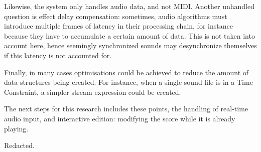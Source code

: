 \documentclass{article}
\begin{document}
Likewise, the system only handles audio data, and not MIDI.
Another unhandled question is effect delay compensation: sometimes, audio algorithms must introduce multiple frames of latency in their processing chain, for instance because they have to accumulate a certain amount of data.
This is not taken into account here, hence seemingly synchronized sounds may desynchronize themselves if this latency is not accounted for.

Finally, in many cases optimisations could be achieved to reduce the amount of data structures being created. For instance, when a single sound file is in a Time Constraint, a simpler stream expression could be created.

The next steps for this research includes these points, the handling of real-time audio input, and interactive edition: modifying the score while it is already playing.

\begin{acknowledgments}
Redacted.%
\end{acknowledgments} 


\end{document}
